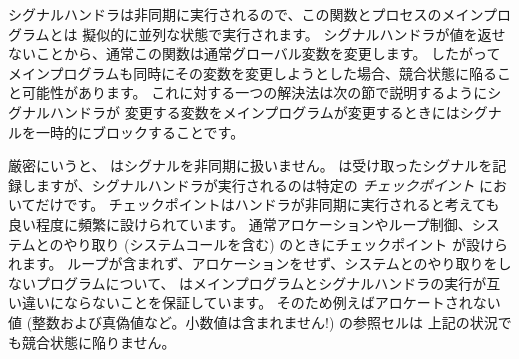 シグナルハンドラは非同期に実行されるので、この関数とプロセスのメインプログラムとは
擬似的に並列な状態で実行されます。
シグナルハンドラが値を返せないことから、通常この関数は通常グローバル変数を変更します。
したがってメインプログラムも同時にその変数を変更しようとした場合、競合状態に陥ること可能性があります。
これに対する一つの解決法は次の節で説明するようにシグナルハンドラが
変更する変数をメインプログラムが変更するときにはシグナルを一時的にブロックすることです。

厳密にいうと、 \ocaml はシグナルを非同期に扱いません。
\ocaml は受け取ったシグナルを記録しますが、シグナルハンドラが実行されるのは特定の \emph{チェックポイント} においてだけです。
チェックポイントはハンドラが非同期に実行されると考えても良い程度に頻繁に設けられています。
通常アロケーションやループ制御、システムとのやり取り (システムコールを含む) のときにチェックポイント
が設けられます。
ループが含まれず、アロケーションをせず、システムとのやり取りをしないプログラムについて、
\ocaml はメインプログラムとシグナルハンドラの実行が互い違いにならないことを保証しています。
そのため例えばアロケートされない値 (整数および真偽値など。小数値は含まれません!) の参照セルは
上記の状況でも競合状態に陥りません。

